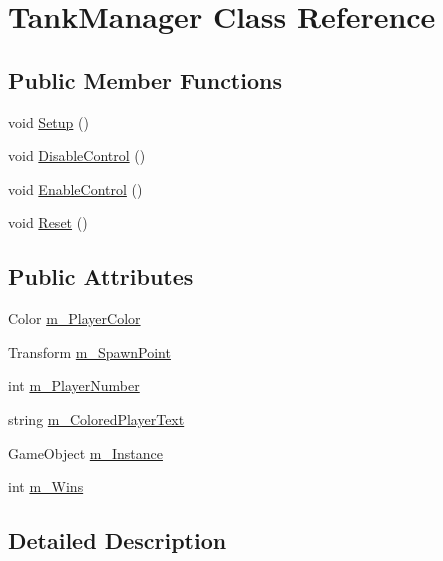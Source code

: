 \hypertarget{class_tank_manager}{}\section{Tank\+Manager Class Reference}
\label{class_tank_manager}
\subsection*{Public Member Functions}
\begin{DoxyCompactItemize}
\item 
void \hyperlink{class_tank_manager_adfea056ff87cf9e231b8517424523587}{Setup} ()
\item 
void \hyperlink{class_tank_manager_a215f539b28fcd32c07f831a28533386d}{Disable\+Control} ()
\item 
void \hyperlink{class_tank_manager_ad904353e6e7eeeaf9bde2092b1e87b66}{Enable\+Control} ()
\item 
void \hyperlink{class_tank_manager_a89675bc32c6dd907f68f7421a7c6e8e2}{Reset} ()
\end{DoxyCompactItemize}
\subsection*{Public Attributes}
\begin{DoxyCompactItemize}
\item 
Color \hyperlink{class_tank_manager_a00f8ea8c026bc2be1215255c572ce24c}{m\+\_\+\+Player\+Color}
\item 
Transform \hyperlink{class_tank_manager_a0a19fbc586bdd84486db536fbe25f61a}{m\+\_\+\+Spawn\+Point}
\item 
int \hyperlink{class_tank_manager_afdf9037848c7f6194f835381752edc3f}{m\+\_\+\+Player\+Number}
\item 
string \hyperlink{class_tank_manager_a57aeeff3cac93ea8ea026a41271e60a0}{m\+\_\+\+Colored\+Player\+Text}
\item 
Game\+Object \hyperlink{class_tank_manager_a16fe43d5057c1b812638a89fde1aa225}{m\+\_\+\+Instance}
\item 
int \hyperlink{class_tank_manager_a87305e8bf77b24464fb5bfc924a1c85e}{m\+\_\+\+Wins}
\end{DoxyCompactItemize}


\subsection{Detailed Description}


